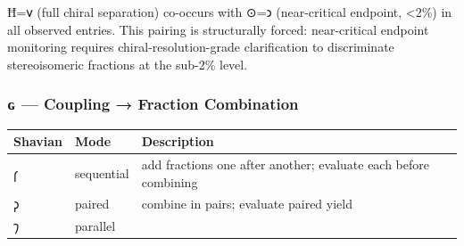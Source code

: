 \documentclass[12pt,a4paper]{article}
\begin{document}
Ħ=𐑫 (full chiral separation) co-occurs with ⊙=𐑮 (near-critical endpoint,
\textless2\%) in all observed entries. This pairing is structurally
forced: near-critical endpoint monitoring requires
chiral-resolution-grade clarification to discriminate stereoisomeric
fractions at the sub-2\% level.

\hypertarget{ux262-coupling-fraction-combination}{%
\subsubsection{ɢ --- Coupling → Fraction
Combination}\label{ux262-coupling-fraction-combination}}

\begin{longtable}[]{@{}lll@{}}
\toprule
\begin{minipage}[b]{0.30\columnwidth}\raggedright
Shavian\strut
\end{minipage} & \begin{minipage}[b]{0.30\columnwidth}\raggedright
Mode\strut
\end{minipage} & \begin{minipage}[b]{0.30\columnwidth}\raggedright
Description\strut
\end{minipage}\tabularnewline
\midrule
\endhead
\begin{minipage}[t]{0.30\columnwidth}\raggedright
𐑝\strut
\end{minipage} & \begin{minipage}[t]{0.30\columnwidth}\raggedright
sequential\strut
\end{minipage} & \begin{minipage}[t]{0.30\columnwidth}\raggedright
add fractions one after another; evaluate each before combining\strut
\end{minipage}\tabularnewline
\begin{minipage}[t]{0.30\columnwidth}\raggedright
𐑜\strut
\end{minipage} & \begin{minipage}[t]{0.30\columnwidth}\raggedright
paired\strut
\end{minipage} & \begin{minipage}[t]{0.30\columnwidth}\raggedright
combine in pairs; evaluate paired yield\strut
\end{minipage}\tabularnewline
\begin{minipage}[t]{0.30\columnwidth}\raggedright
𐑠\strut
\end{minipage} & \begin{minipage}[t]{0.30\columnwidth}\raggedright
parallel\strut

\end{minipage}
\end{longtable}
\end{document}
